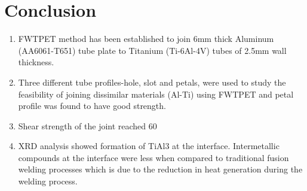 \documentclass[3p]{elsarticle}
\begin{document}
\section{Conclusion}
\label{sec:Conclusion}
\begin{enumerate}[1.]
\item FWTPET method has been established to join 6mm thick Aluminum (AA6061-T651) tube plate to Titanium (Ti-6Al-4V) tubes of 2.5mm wall thickness.
\item Three different tube profiles-hole, slot and petals, were used to study the feasibility of joining dissimilar materials (Al-Ti) using FWTPET and petal profile was found to have good strength.
\item Shear strength of the joint reached 60%
\item XRD analysis showed formation of TiAl3 at the interface. Intermetallic compounds at the interface were less when compared to traditional fusion welding processes which is due to the reduction in heat generation during the welding process.
\end{enumerate}


%

%








\end{document}
